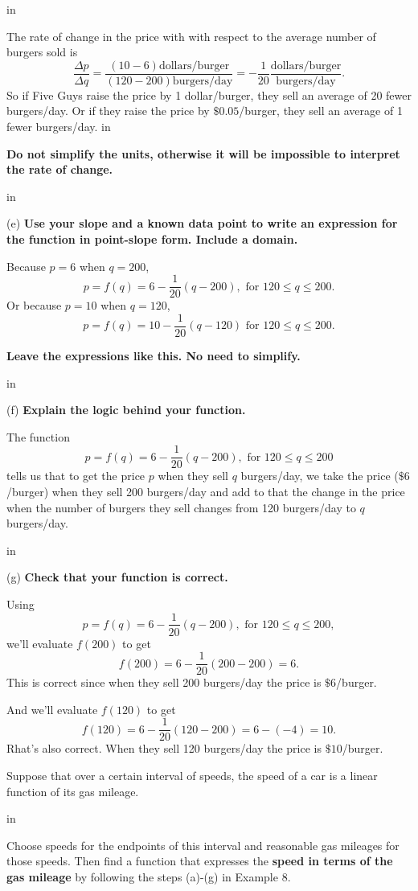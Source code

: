 \documentclass{ximera}
\newcommand{\pskip}{\vskip 0.1 in}
\begin{document}
\begin{example}
\begin{explanation}
\pskip

The rate of change in the price with with respect to the average number of burgers sold is
\[
   \frac{\Delta p}{\Delta q} = \frac{(10-6) \text{dollars/burger}}{(120-200) \text{burgers/day}} = -\frac{1}{20} \frac{\text{dollars/burger}}{\text{burgers/day} } .
\]
So if Five Guys raise the price by 1 dollar/burger, they sell an average of 20 fewer burgers/day. Or if they raise the price by $\$0.05$/burger, they sell an average of 1 fewer burgers/day.
\pskip

{\bf Do not simplify the units, otherwise it will be impossible to interpret the rate of change.}

\pskip

(e) {\bf Use your slope and a known data point to write an expression for the function in point-slope form. Include a domain.}

Because $p=6$ when $q=200$, 
\[
  p = f(q) = 6 - \frac{1}{20} \left( q - 200 \right) , \text{ for } 120\leq q \leq 200 . 
\]
Or  because $p=10$ when $q=120$, 
\[
  p = f(q) = 10 - \frac{1}{20} \left( q - 120 \right) \text{ for } 120\leq q \leq 200.
\]
\end{explanation}
{\bf Leave the expressions like this. No need to simplify.}

\pskip 

(f) {\bf Explain the logic behind your function.}

The function
\[
   p = f(q) = 6 - \frac{1}{20} \left( q - 200 \right) , \text{ for } 120\leq q \leq 200
\]
tells us that to get the price $p$ when they sell $q$ burgers/day, we take the price ($\$6$/burger) when they sell 200 burgers/day and add to that the change in the price when the number of burgers they sell changes from 120 burgers/day to $q$  burgers/day.

\pskip

(g) {\bf Check that your function is correct.}

Using
\[
  p = f(q) = 6 - \frac{1}{20} \left( q - 200 \right) , \text{ for } 120\leq q \leq 200 , 
\]
we'll evaluate $f(200)$ to get
\[
    f(200) = 6 - \frac{1}{20} \left( 200 - 200 \right) =6 .
\]
This is correct since when they sell 200 burgers/day the price is $\$6$/burger.

And we'll evaluate $f(120)$ to get
\[
  f(120) = 6 - \frac{1}{20} \left( 120 - 200 \right)  = 6 - (-4) = 10 .
\]
Rhat's also correct. When they sell 120 burgers/day the price is $\$10$/burger.




\end{example}


\begin{example} \label{Ex6:LF}
Suppose that over a certain interval of speeds, the speed of a car is a linear function of its gas mileage. 

\pskip

Choose speeds for the endpoints of this interval and reasonable gas mileages for those speeds. Then find a function that expresses the {\bf speed in terms of the gas mileage} by following the steps (a)-(g) in Example 8.
\end{example}
\end{document}
